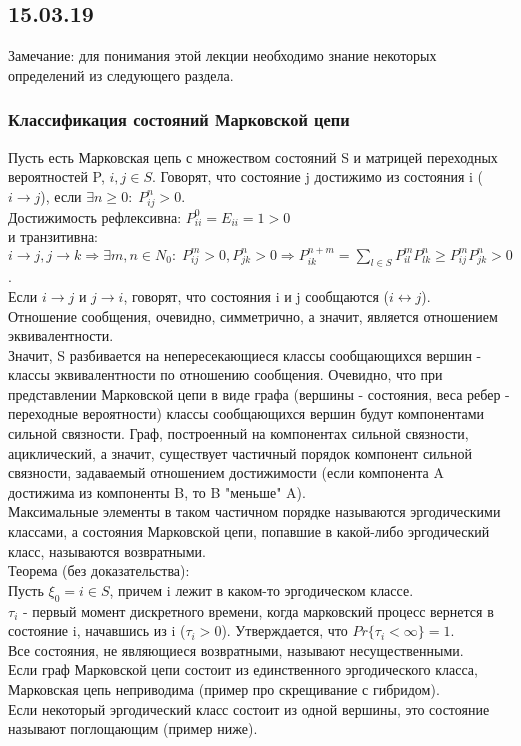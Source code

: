 \subsection{15.03.19}
Замечание: для понимания этой лекции необходимо знание некоторых определений из следующего раздела.
\subsubsection{Классификация состояний Марковской цепи}
Пусть есть Марковская цепь с множеством состояний S и матрицей переходных вероятностей P, $i, j \in S$.
Говорят, что состояние j достижимо из состояния i ($i \rightarrow j$), если $\exists n \geq 0: \; P^n_{ij} > 0$.\\
Достижимость рефлексивна: $P^0_{ii} = E_{ii} = 1 > 0$\\
и транзитивна: $i \rightarrow j, j \rightarrow k \Rightarrow \exists m, n \in N_0: \; P^m_{ij} > 0, P^n_{jk} > 0 \Rightarrow P^{n + m}_{ik} = \sum\limits_{l \in S} P^m_{il}P^n_{lk} \geq P^m_{ij}P^n_{jk} > 0$.\\
Если $i \rightarrow j$ и $j \rightarrow i$, говорят, что состояния i и j сообщаются ($i \leftrightarrow j$).\\
Отношение сообщения, очевидно, симметрично, а значит, является отношением эквивалентности.\\
Значит, S разбивается на непересекающиеся классы сообщающихся вершин - классы эквивалентности по отношению сообщения.
Очевидно, что при представлении Марковской цепи в виде графа (вершины - состояния, веса ребер - переходные вероятности) классы сообщающихся вершин будут компонентами сильной связности.
Граф, построенный на компонентах сильной связности, ациклический, а значит, существует частичный порядок компонент сильной связности, задаваемый отношением достижимости (если компонента A достижима из компоненты B, то B "меньше" A).\\
Максимальные элементы в таком частичном порядке называются эргодическими классами, а состояния Марковской цепи, попавшие в какой-либо эргодический класс, называются возвратными.\\
Теорема (без доказательства):\\
Пусть $\xi_0 = i \in S$, причем i лежит в каком-то эргодическом классе.\\
$\tau_i$ - первый момент дискретного времени, когда марковский процесс вернется в состояние i, начавшись из i ($\tau_i > 0$). Утверждается, что $Pr\{\tau_i < \infty\} = 1$.\\
Все состояния, не являющиеся возвратными, называют несущественными.\\
Если граф Марковской цепи состоит из единственного эргодического класса, Марковская цепь неприводима (пример про скрещивание с гибридом).\\
Если некоторый эргодический класс состоит из одной вершины, это состояние называют поглощающим (пример ниже).
